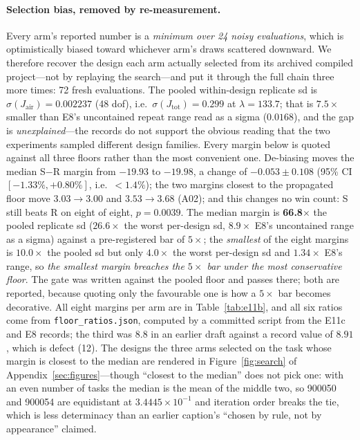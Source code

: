 \documentclass{article}
\newcommand{\Jair}{J_{\mathrm{air}}}
\newcommand{\Jtot}{J_{\mathrm{tot}}}
\begin{document}
\paragraph{Selection bias, removed by re-measurement.}
Every arm's reported number is a \emph{minimum over 24 noisy evaluations}, which is
optimistically biased toward whichever arm's draws scattered downward.  We therefore
recover the design each arm actually selected from its archived compiled project---not by
replaying the search---and put it through the full chain three more times: 72 fresh
evaluations.  The pooled within-design replicate sd is $\sigma(\Jair) = 0.002237$
(48 dof), i.e.\ $\sigma(\Jtot) = 0.299$ at $\lambda = 133.7$; that is $7.5\times$ smaller
than E8's uncontained repeat range read as a sigma ($0.0168$), and the gap is
\emph{unexplained}---the records do not support the obvious reading that the two
experiments sampled different design families.  Every margin below is quoted against all
three floors rather than the most convenient one.  De-biasing moves the median S$-$R
margin from $-19.93$ to $\mathbf{-19.98}$, a change of $-0.053 \pm 0.108$
(95\% CI $[-1.33\%, +0.80\%]$, i.e.\ $<1.4\%$); the two margins closest to the
propagated floor move $3.03 \to 3.00$ and $3.53 \to 3.68$ (A02); and this changes no
win count: S still beats R on eight of eight,
$p = 0.0039$.  The median margin is \textbf{66.8$\times$} the pooled replicate sd
($26.6\times$ the worst per-design sd, $8.9\times$ E8's uncontained range as a sigma)
against a pre-registered bar of $5\times$; the \emph{smallest} of the eight margins is
$10.0\times$ the pooled sd but only $4.0\times$ the worst per-design sd and
$1.34\times$ E8's range, so \emph{the smallest margin breaches the $5\times$ bar under
the most conservative floor}.  The gate was written against the pooled floor and passes
there; both are reported, because quoting only the favourable one is how a $5\times$ bar
becomes decorative.  All eight margins per arm are in Table~\ref{tab:e11b}, and all six
ratios come from \texttt{floor\_ratios.json}, computed by a committed script from the
E11c and E8 records; the third was $8.8$ in an earlier draft
against a record value of $8.91$, which is defect (12).  The designs the three arms
selected on the task whose margin is closest to the median are rendered in
Figure~\ref{fig:search} of Appendix~\ref{sec:figures}---though ``closest to the median'' does not pick one: with an even
number of tasks the median is the mean of the middle two, so 900050 and 900054 are
equidistant at $3.4445\times10^{-1}$ and iteration order breaks the tie, which is less
determinacy than an earlier caption's ``chosen by rule, not by appearance'' claimed.
\end{document}

